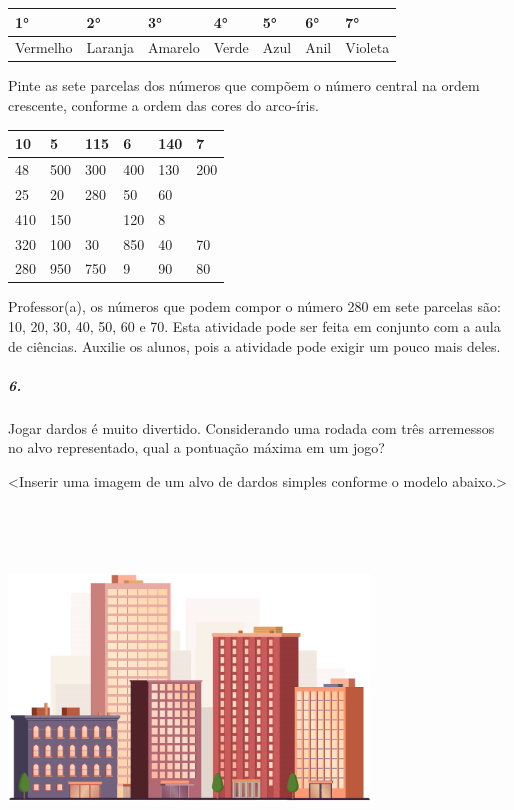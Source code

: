 \begin{longtable}[]{@{}lllllll@{}}
\toprule
1° & 2° & 3° & 4° & 5° & 6° & 7°\tabularnewline
\midrule
\endhead
Vermelho & Laranja & Amarelo & Verde & Azul & Anil &
Violeta\tabularnewline
\bottomrule
\end{longtable}

Pinte as sete parcelas dos números que compõem o número central na ordem
crescente, conforme a ordem das cores do arco-íris.

\begin{longtable}[]{@{}llllll@{}}
\toprule
10 & 5 & 115 & 6 & 140 & 7\tabularnewline
\midrule
\endhead
48 & 500 & 300 & 400 & 130 & 200\tabularnewline
25 & 20 & 280 & 50 & 60\tabularnewline
410 & 150 & & 120 & 8\tabularnewline
320 & 100 & 30 & 850 & 40 & 70\tabularnewline
280 & 950 & 750 & 9 & 90 & 80\tabularnewline
\bottomrule
\end{longtable}

Professor(a), os números que podem compor o número 280 em sete parcelas
são: 10, 20, 30, 40, 50, 60 e 70. Esta atividade pode ser feita em
conjunto com a aula de ciências. Auxilie os alunos, pois a atividade
pode exigir um pouco mais deles.

\subparagraph{6.}\label{section-19}

Jogar dardos é muito divertido. Considerando uma rodada com três arremessos no alvo representado, qual a pontuação
máxima em um jogo?

\textless{}Inserir uma imagem de um alvo de dardos simples conforme o
modelo abaixo.\textgreater{}

\includegraphics[width=3.78624in,height=3.80208in]{media/image31.png}

